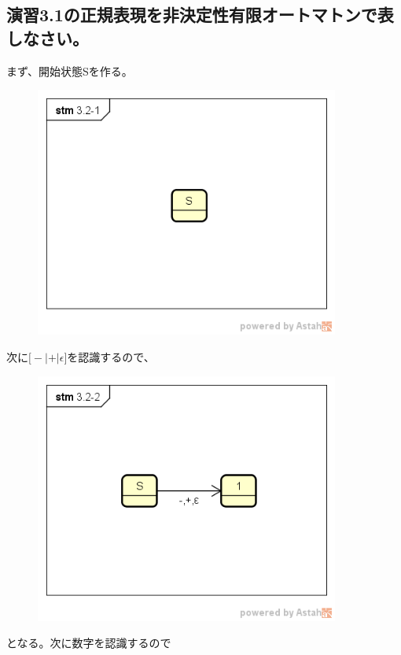 \documentclass[a4paper,12pt]{jarticle}
\begin{document}
\subsection{演習3.1の正規表現を非決定性有限オートマトンで表しなさい。}
まず、開始状態Sを作る。
\begin{figure}[H]
 \begin{center}
  \includegraphics[width=10cm]{Automatonfig/3-2-1.png}
 \end{center}
\end{figure}
次に$ \bigl[ - | + | \epsilon \bigr] $を認識するので、
\begin{figure}[H]
 \begin{center}
  \includegraphics[width=10cm]{Automatonfig/3-2-2.png}
 \end{center}
\end{figure}
となる。次に$ 数字 $を認識するので
\end{document}
